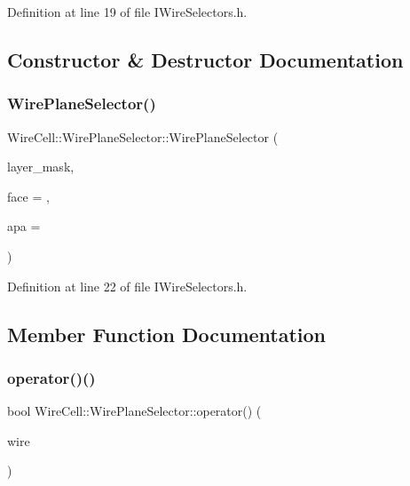 Definition at line 19 of file I\+Wire\+Selectors.\+h.



\subsection{Constructor \& Destructor Documentation}
\mbox{\label{struct_wire_cell_1_1_wire_plane_selector_acd40edb520122cc31b786a20bf124318}} 
\subsubsection{\texorpdfstring{Wire\+Plane\+Selector()}{WirePlaneSelector()}}
{\footnotesize\ttfamily Wire\+Cell\+::\+Wire\+Plane\+Selector\+::\+Wire\+Plane\+Selector (\begin{DoxyParamCaption}\item[{int}]{layer\+\_\+mask,  }\item[{int}]{face = {},  }\item[{int}]{apa = {} }\end{DoxyParamCaption})\hspace{0.3cm}{\ttfamily [inline]}}



Definition at line 22 of file I\+Wire\+Selectors.\+h.



\subsection{Member Function Documentation}
\mbox{\label{struct_wire_cell_1_1_wire_plane_selector_a4eed0b861e35e6e53872247eefa03fd8}} 
\subsubsection{\texorpdfstring{operator()()}{operator()()}}
{\footnotesize\ttfamily bool Wire\+Cell\+::\+Wire\+Plane\+Selector\+::operator() (\begin{DoxyParamCaption}\item[{\hyperlink{class_wire_cell_1_1_i_data_aff870b3ae8333cf9265941eef62498bc}{I\+Wire\+::pointer}}]{wire }\end{DoxyParamCaption})\hspace{0.3cm}{\ttfamily [inline]}}




